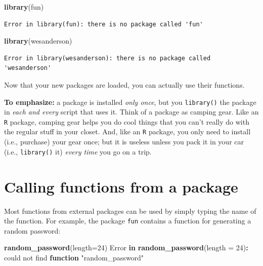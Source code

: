 \documentclass[
]{book}
\newenvironment{Shaded}{\begin{snugshade}}{\end{snugshade}}
\newcommand{\AttributeTok}[1]{\textcolor[rgb]{0.13,0.29,0.53}{#1}}
\newcommand{\ControlFlowTok}[1]{\textcolor[rgb]{0.13,0.29,0.53}{\textbf{#1}}}
\newcommand{\DecValTok}[1]{\textcolor[rgb]{0.00,0.00,0.81}{#1}}
\newcommand{\FunctionTok}[1]{\textcolor[rgb]{0.13,0.29,0.53}{\textbf{#1}}}
\newcommand{\NormalTok}[1]{#1}
\newcommand{\SpecialCharTok}[1]{\textcolor[rgb]{0.81,0.36,0.00}{\textbf{#1}}}
\newcommand{\StringTok}[1]{\textcolor[rgb]{0.31,0.60,0.02}{#1}}
\begin{document}
\begin{Shaded}
\begin{Highlighting}[]
\FunctionTok{library}\NormalTok{(fun)}
\end{Highlighting}
\end{Shaded}

\begin{verbatim}
Error in library(fun): there is no package called 'fun'
\end{verbatim}

\begin{Shaded}
\begin{Highlighting}[]
\FunctionTok{library}\NormalTok{(wesanderson)}
\end{Highlighting}
\end{Shaded}

\begin{verbatim}
Error in library(wesanderson): there is no package called 'wesanderson'
\end{verbatim}

Now that your new packages are loaded, you can actually use their functions.

\textbf{To emphasize:} a package is installed \emph{only once}, but you \texttt{library()} the package in \emph{each and every} script that uses it. Think of a package as camping gear. Like an \texttt{R} package, camping gear helps you do cool things that you can't really do with the regular stuff in your closet. And, like an \texttt{R} package, you only need to install (i.e., purchase) your gear once; but it is useless unless you pack it in your car (i.e., \texttt{library()} it) \emph{every time} you go on a trip.

\section*{Calling functions from a package}\label{calling-functions-from-a-package}

Most functions from external packages can be used by simply typing the name of the function. For example, the package \texttt{fun} contains a function for generating a random password:

\begin{Shaded}
\begin{Highlighting}[]
\FunctionTok{random\_password}\NormalTok{(}\AttributeTok{length=}\DecValTok{24}\NormalTok{)}
\NormalTok{Error }\ControlFlowTok{in} \FunctionTok{random\_password}\NormalTok{(}\AttributeTok{length =} \DecValTok{24}\NormalTok{)}\SpecialCharTok{:}\NormalTok{ could not find }\ControlFlowTok{function} \StringTok{"random\_password"}
\end{Highlighting}
\end{Shaded}
\end{document}
